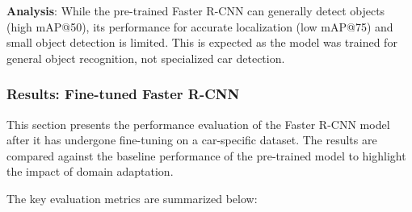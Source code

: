 \documentclass[conference]{IEEEtran}
\begin{document}
\textbf{Analysis}: While the pre-trained Faster R-CNN can generally detect objects (high mAP@50), its performance for accurate localization (low mAP@75) and small object detection is limited. This is expected as the model was trained for general object recognition, not specialized car detection. 

\subsubsection{Results: Fine-tuned Faster R-CNN}
\label{ssec:results_fasterrcnn_finetuned}

This section presents the performance evaluation of the Faster R-CNN model after it has undergone fine-tuning on a car-specific dataset. The results are compared against the baseline performance of the pre-trained model to highlight the impact of domain adaptation.

The key evaluation metrics are summarized below:
\end{document}
